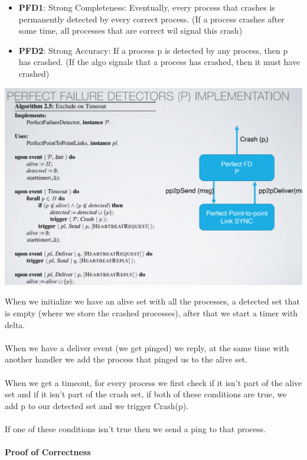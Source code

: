 \documentclass[11pt, a4paper]{article}
\begin{document}
\begin{itemize}
    \item \textbf{PFD1}: Strong Completeness: Eventually, every process that crashes is permanently detected by every correct process. (If a process crashes after some time, all processes that are correct wil signal this crash)
    \item \textbf{PFD2}: Strong Accuracy: If a process p is detected by any process, then p has crashed. (If the algo signals that a process has crashed, then it must have crashed)
\end{itemize}
\begin{center}
    \includegraphics[scale=0.5]{img/FD/algo.png}
\end{center}
When we initialize we have an alive set with all the processes, a detected set that is empty (where we store the crashed processes), after that we start a timer with delta.\\\\
When we have a deliver event (we get pinged) we reply, at the same time with another handler we add the process that pinged us to the alive set.\\\\
When we get a timeout, for every process we first check if it isn’t part of the alive set and if it isn’t part of the crash set, if both of these conditions are true, we add p to our detected set and we trigger Crash(p).\\\\
If one of these conditions isn’t true then we send a ping to that process.\\\\
\textbf{Proof of Correctness}\\
\end{document}
